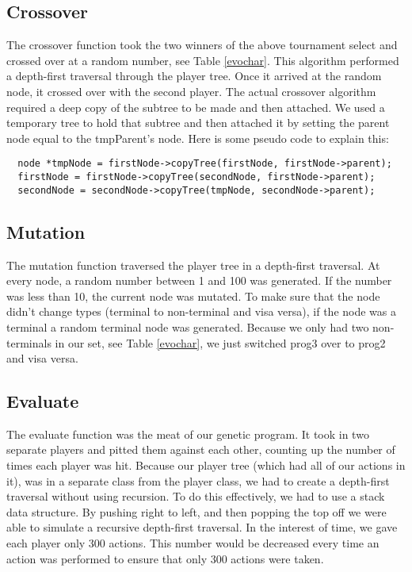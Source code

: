 \documentclass{acm_proc_article-sp}
\begin{document}
\subsection{Crossover}
The crossover function took the two winners of the above tournament select and crossed over at a random number, see Table \ref{evochar}. This algorithm performed a depth-first traversal through the player tree. Once it arrived at the random node, it crossed over with the second player. The actual crossover algorithm required a deep copy of the subtree to be made and then attached. We used a temporary tree to hold that subtree and then attached it by setting the parent node equal to the tmpParent's node. Here is some pseudo code to explain this:
\begin{verbatim}
  node *tmpNode = firstNode->copyTree(firstNode, firstNode->parent);
  firstNode = firstNode->copyTree(secondNode, firstNode->parent);
  secondNode = secondNode->copyTree(tmpNode, secondNode->parent);
\end{verbatim}

\subsection{Mutation}
The mutation function traversed the player tree in a depth-first traversal. At every node, a random number between 1 and 100 was generated. If the number was less than 10, the current node was mutated. To make sure that the node didn't change types (terminal to non-terminal and visa versa), if the node was a terminal a random terminal node was generated. Because we only had two non-terminals in our set, see Table \ref{evochar}, we just switched prog3 over to prog2 and visa versa.

\subsection{Evaluate}
The evaluate function was the meat of our genetic program. It took in two separate players and pitted them against each other, counting up the number of times each player was hit. Because our player tree (which had all of our actions in it), was in a separate class from the player class, we had to create a depth-first traversal without using recursion. To do this effectively, we had to use a stack data structure. By pushing right to left, and then popping the top off we were able to simulate a recursive depth-first traversal. In the interest of time, we gave each player only 300 actions. This number would be decreased every time an action was performed to ensure that only 300 actions were taken.
\end{document}

